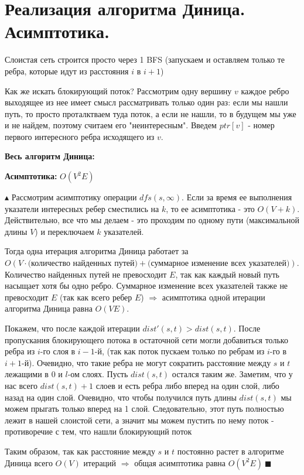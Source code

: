 \setcounter{section}{82}
\section{Реализация алгоритма Диница. Асимптотика.}
\par Слоистая сеть строится просто через 1 BFS (запускаем и оставляем только те ребра, которые идут из расстояния $i$ в $i+1$)
\par Как же искать блокирующий поток? Рассмотрим одну вершину $v$ каждое ребро выходящее из нее имеет смысл рассматривать только один раз: если мы нашли путь, то просто проталктваем туда поток, а если не нашли, то в будущем мы уже и не найдем, поэтому считаем его "неинтересным". Введем $ptr[v]$ - номер первого интересного ребра исходящего из $v$.


\textbf{Весь алгоритм Диница:}


\par \textbf{Асимптотика:} $O(V^2 E)$
\par $\blacktriangle$ Рассмотрим асимптотику операции $dfs(s, \infty)$. Если за время ее выполнения указатели интересных ребер сместились на $k$, то ее асимптотика - это $O(V+k)$. Действительно, все что мы делаем - это проходим по одному пути (максимальной длины $V$) и переключаем $k$ указателей.
\par Тогда одна итерация алгоритма Диница работает за $O(V\cdot \text{(количество найденных путей)}+\text{(суммарное изменение всех указателей)})$. Количество найденных путей не превосходит $E$, так как каждый новый путь насыщает хотя бы одно ребро. Суммарное изменение всех указателей также не превосходит $E$ (так как всего ребер $E$) $\Rightarrow$ асимптотика одной итерации алгоритма Диница равна $O(VE)$.
\par Покажем, что после каждой итерации $dist'(s,t)>dist(s,t)$. После пропускания блокирующего потока в остаточной сети могли добавиться только ребра из $i$-го слоя в $i-1$-й, (так как поток пускаем только по ребрам из $i$-го в $i+1$-й). Очевидно, что такие ребра не могут сократить расстояние между $s$ и $t$ лежащими в $0$ и $l$-ом слоях. Пусть $dist(s,t)$ остался таким же. Заметим, что у нас всего $dist(s,t)+1$ слоев и есть ребра либо вперед на один слой, либо назад на один слой. Очевидно, что чтобы получился путь длины $dist(s,t)$ мы можем прыгать только вперед на 1 слой. Следовательно, этот путь полностью лежит в нашей слоистой сети, а значит мы можем пустить по нему поток - противоречие с тем, что нашли блокирующий поток
\par Таким образом, так как расстояние между $s$ и $t$ постоянно растет в алгоритме Диница всего $O(V)$ итераций $\Rightarrow$ общая асимптотика равна $O(V^2 E) \: \blacksquare$
\setcounter{section}{83}
